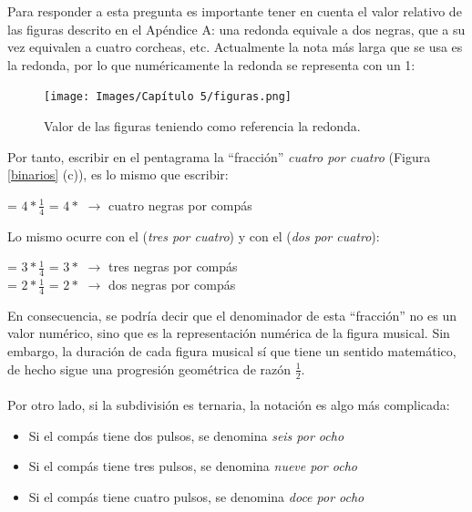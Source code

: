 \documentclass[a4paper, openright, 11pt, titlepage]{report}
\theoremstyle{definition}\newtheorem{defin}[propo]{Definition}
\theoremstyle{definition}\newtheorem{obser}[propo]{Remark}
\theoremstyle{definition}\newtheorem{ejem}[propo]{Ejemplo}
\theoremstyle{definition}\newtheorem{algoritmo}[propo]{Algoritmo}
\begin{document}
Para responder a esta pregunta es importante tener en cuenta el valor relativo de las figuras descrito en el Apéndice A: una redonda equivale a dos negras, que a su vez equivalen a cuatro corcheas, etc. Actualmente la nota más larga que se usa es la redonda, por lo que numéricamente la redonda se representa con un 1:
\begin{figure}[H]
    \centering
    \texttt{[image: Images/Capítulo 5/figuras.png]}
    \caption{Valor de las figuras teniendo como referencia la redonda.}
    \label{redonda}
\end{figure}
Por tanto, escribir en el pentagrama la ``fracción'' \textit{cuatro por cuatro} (Figura \ref{binarios} (c)), es lo mismo que escribir:
\begin{center}
     = $4 * \frac{1}{4}$ = $4 * $\musQuarter \hspace{0.3cm} $\longrightarrow$ \hspace{0.3cm} cuatro negras por compás
\end{center}
Lo mismo ocurre con el  (\textit{tres por cuatro}) y con el  (\textit{dos por cuatro}):
\begin{center}
     = $3 * \frac{1}{4}$ = $3 * $\musQuarter \hspace{0.3cm} $\longrightarrow$ \hspace{0.3cm} tres negras por compás\\
     = $2 * \frac{1}{4}$ = $2 * $\musQuarter \hspace{0.3cm} $\longrightarrow$ \hspace{0.3cm} dos negras por compás
\end{center}
En consecuencia, se podría decir que el denominador de esta ``fracción'' no es un valor numérico, sino que es la representación numérica de la figura musical. Sin embargo, la duración de cada figura musical sí que tiene un sentido matemático, de hecho sigue una progresión geométrica de razón $\frac{1}{2}$.\\\\
Por otro lado, si la subdivisión es ternaria, la notación es algo más complicada: 
\begin{itemize}
    \item Si el compás tiene dos pulsos, se denomina \textit{seis por ocho}
    \item Si el compás tiene tres pulsos, se denomina \textit{nueve por ocho}
    \item Si el compás tiene cuatro pulsos, se denomina \textit{doce por ocho}
\end{itemize}
\end{document}
